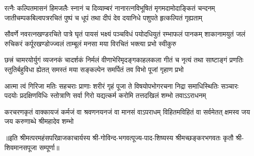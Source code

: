
\fourlineindentedshloka
{रत्नैः कल्पितमासनं हिमजलैः स्नानं च दिव्याम्बरं}
{नानारत्नविभूषितं मृगमदामोदाङ्कितं चन्दनम्}
{जातीचम्पकबिल्वपत्ररचितं पुष्पं च धूपं तथा}
{दीपं देव दयानिधे पशुपते हृत्कल्पितं गृह्यताम्}

\fourlineindentedshloka
{सौवर्णे नवरत्नखण्डरचिते पात्रे घृतं पायसं}
{भक्ष्यं पञ्चविधं पयोदधियुतं रम्भाफलं पानकम्}
{शाकानामयुतं जलं रुचिकरं कर्पूरखण्डोज्ज्वलं}
{ताम्बूलं मनसा मया विरचितं भक्त्या प्रभो स्वीकुरु}

\fourlineindentedshloka
{छत्त्रं चामरयोर्युगं व्यजनकं चादर्शकं निर्मलं}
{वीणाभेरिमृदङ्गकाहलकला गीतं च नृत्यं तथा}
{साष्टाङ्गं प्रणतिः स्तुतिर्बहुविधा ह्येतत् समस्तं मया}
{सङ्कल्पेन समर्पितं तव विभो पूजां गृहाण प्रभो}

\fourlineindentedshloka
{आत्मा त्वं गिरिजा मतिः सहचराः प्राणाः शरीरं गृहं}
{पूजा ते विषयोपभोगरचना निद्रा समाधिस्थितिः}
{सञ्चारः पदयोः प्रदक्षिणविधिः स्तोत्राणि सर्वा गिरो}
{यद्यत्कर्म करोमि तत्तदखिलं शम्भो तवाऽऽराधनम्}

\fourlineindentedshloka
{करचरणकृतं वाक्कायजं कर्मजं वा}
{श्रवणनयनजं वा मानसं वाऽपराधम्}
{विहितमविहितं वा सर्वमेतत् क्षमस्व}
{जय जय करुणाब्धे श्रीमहादेव शम्भो}

॥इति  श्रीमत्परमहंसपरिव्राजकाचार्यस्य श्री-गोविन्द-भगवत्पूज्य-पाद-शिष्यस्य
श्रीमच्छङ्करभगवतः कृतौ श्री-शिवमानसपूजा सम्पूर्णा॥